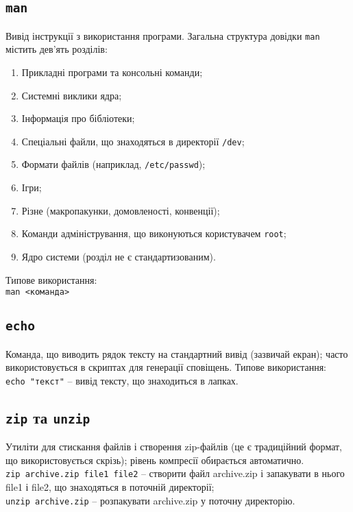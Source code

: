 \documentclass[10pt,a4paper]{fancyhandout}
\begin{document}
\subsection{\texttt{man}}
Вивід інструкції з використання програми. Загальна структура довідки \texttt{man} містить дев'ять розділів:
\begin{enumerate}
	\item Прикладні програми та консольні команди;
	\item Системні виклики ядра;
	\item Інформація про бібліотеки;
	\item Спеціальні файли, що знаходяться в директорії \texttt{/dev};
	\item Формати файлів (наприклад, \texttt{/etc/passwd});
	\item Ігри;
	\item Різне (макропакунки, домовленості, конвенції);
	\item Команди адміністрування, що виконуються користувачем \texttt{root};
	\item Ядро системи (розділ не є стандартизованим).
\end{enumerate}
Типове використання: \\
\texttt{man <команда>}
\goodbreak

\subsection{\texttt{echo}}
Команда, що виводить рядок тексту на стандартний вивід (зазвичай екран); часто використовується в скриптах для генерації сповіщень. Типове використання: \\
\texttt{echo "текст"} -- вивід тексту, що знаходиться в лапках.
\goodbreak

\subsection{\texttt{zip} та \texttt{unzip}}
Утиліти для стискання файлів і створення zip-файлів (це є традиційний формат, що використовується скрізь); рівень компресії обирається автоматично.\\
\texttt{zip archive.zip file1 file2} -- створити файл archive.zip і запакувати в нього file1 і file2, що знаходяться в поточній директорії; \\
\texttt{unzip archive.zip} -- розпакувати archive.zip у поточну директорію.
\goodbreak
\end{document}
